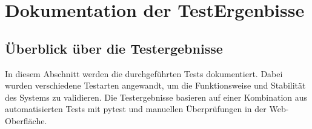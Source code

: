 \section{Dokumentation der TestErgenbisse}\label{Dokumentation der Testergebnisse}

\subsection{Überblick über die Testergebnisse}


\footnotesize


In diesem Abschnitt werden die durchgeführten Tests dokumentiert. Dabei wurden verschiedene Testarten angewandt, um die Funktionsweise und Stabilität des Systems zu validieren. 
Die Testergebnisse basieren auf einer Kombination aus automatisierten Tests mit pytest und manuellen Überprüfungen in der Web-Oberfläche.\par

